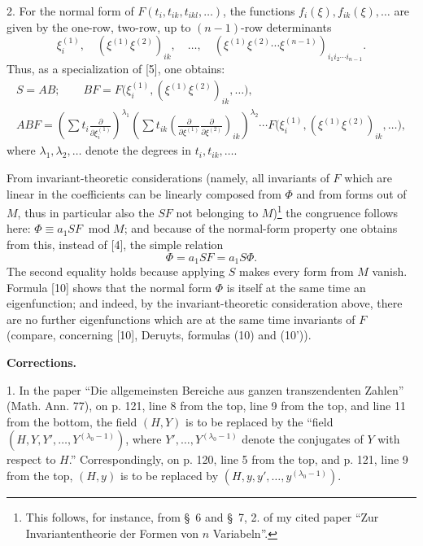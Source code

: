 \documentclass[11pt]{article}
\newcommand{\modu}[1]{\;\operatorname{mod} #1}
\providecommand{\p}{\partial}
\providecommand{\p}{\partial}
\providecommand{\modu}[1]{\;\operatorname{mod} #1}
\begin{document}
2. For the normal form of $F(t_i,t_{ik},t_{ikl},\ldots)$, the functions $f_i(\xi),f_{ik}(\xi),\ldots$ are given by the one-row, two-row, up to $(n-1)$-row determinants
\[
        \xi_i^{(1)},\quad (\xi^{(1)}\xi^{(2)})_{ik},\quad\ldots,\quad
        (\xi^{(1)}\xi^{(2)}\cdots\xi^{(n-1)})_{i_1i_2\cdots i_{n-1}}.
\]
Thus, as a specialization of [5], one obtains:
\[
\begin{gathered}
        S=AB;\qquad
        BF=F\bigl(\xi_i^{(1)},(\xi^{(1)}\xi^{(2)})_{ik},\ldots\bigr),\\
        ABF=\left(\sum t_i\frac{\p}{\p\xi_i^{(1)}}\right)^{\lambda_1}
        \left(\sum t_{ik}\left(\frac{\p}{\p\xi^{(1)}}\frac{\p}{\p\xi^{(2)}}\right)_{ik}\right)^{\lambda_2}
        \cdots F\bigl(\xi_i^{(1)},(\xi^{(1)}\xi^{(2)})_{ik},\ldots\bigr),
\end{gathered}
\]
where $\lambda_1,\lambda_2,\ldots$ denote the degrees in $t_i,t_{ik},\ldots$.

From invariant-theoretic considerations (namely, all invariants of $F$ which are linear in the coefficients can be linearly composed from $\Phi$ and from forms out of $M$, thus in particular also the $SF$ not belonging to $M$)\footnote{This follows, for instance, from \S~6 and \S~7, 2. of my cited paper ``Zur Invariantentheorie der Formen von $n$ Variabeln''.} the congruence follows here: $\Phi\equiv a_1SF\modu{M}$; and because of the normal-form property one obtains from this, instead of [4], the simple relation
\begin{equation}
        \Phi=a_1SF=a_1S\Phi.
\tag{10}
\end{equation}
The second equality holds because applying $S$ makes every form from $M$ vanish. Formula [10] shows that the normal form $\Phi$ is itself at the same time an eigenfunction; and indeed, by the invariant-theoretic consideration above, there are no further eigenfunctions which are at the same time invariants of $F$ (compare, concerning [10], Deruyts, formulas (10) and (10')).

\begin{center}
\textbf{Corrections.}
\end{center}

1. In the paper ``Die allgemeinsten Bereiche aus ganzen transzendenten Zahlen'' (Math. Ann. 77), on p. 121, line 8 from the top, line 9 from the top, and line 11 from the bottom, the field $(H,Y)$ is to be replaced by the ``field $(H,Y,Y',\ldots,Y^{(\lambda_0-1)})$, where $Y',\ldots,Y^{(\lambda_0-1)}$ denote the conjugates of $Y$ with respect to $H$.'' Correspondingly, on p. 120, line 5 from the top, and p. 121, line 9 from the top, $(H,y)$ is to be replaced by $(H,y,y',\ldots,y^{(\lambda_0-1)})$.
\end{document}
